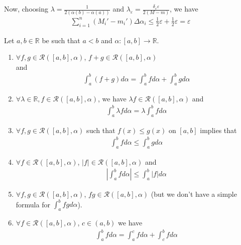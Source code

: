 \documentclass{tufte-handout}
\begin{document}
Now, choosing \( \lambda = \frac{1}{2(\alpha(b) - \alpha(a))} \) and \( \lambda_\varepsilon = \frac{\delta_\varepsilon\varepsilon}{2(M-m)} \), we have
\begin{align}
    \sum_{i=1}^{n}(M_i' - m_i')\Delta \alpha_i \leq \frac{1}{2}\varepsilon + \frac{1}{2}\varepsilon = \varepsilon
\end{align}
\hfill \qedsymbol

\begin{Proposition}
    Let \( a, b \in \mathbb{R} \) be such that \( a<b \)
    and \( \alpha: [a,b]\to \mathbb{R} \).
    \begin{enumerate}
        \item \(\forall f,g \in \mathcal{R}([a,b], \alpha)\), \( f+g \in \mathcal{R}([a,b], \alpha) \)\\
        and 
        \begin{align}
            \int_{a}^b (f+g)d\alpha = \int_{a}^b fd\alpha + \int_{a}^b gd\alpha
        \end{align}
        \item \(\forall \lambda \in \mathbb{R}, f \in \mathcal{R}([a,b], \alpha)\),
        we have \( \lambda f \in \mathcal{R}([a,b], \alpha) \) and\\
        \begin{align}
            \int_{a}^b \lambda f d\alpha = \lambda \int_{a}^b fd\alpha
        \end{align}
        \item \(\forall f,g \in \mathcal{R}([a,b], \alpha)\) such that \( f(x) \leq g(x) \) on \( [a,b] \)
        implies that 
        \begin{align}
            \int_{a}^b fd\alpha \leq \int_{a}^b gd\alpha
        \end{align}
        \item \(\forall f \in \mathcal{R}([a,b], \alpha)\), \( |f| \in \mathcal{R}([a,b], \alpha) \) and
        \begin{align}
            \left|\int_{a}^b fd\alpha\right| \leq \int_{a}^b |f|d\alpha
        \end{align}
        \item \(\forall f,g \in \mathcal{R}([a,b], \alpha)\),
        \( fg \in \mathcal{R}([a,b], \alpha) \) (but we don't have a simple formula for \( \int_{a}^b fg d\alpha \)).
        \item \(\forall f \in \mathcal{R}([a,b], \alpha)\), \( c \in (a,b) \) 
        we have 
        \begin{align}
            \int_{a}^b fd\alpha = \int_{a}^c fd\alpha + \int_{c}^b fd\alpha
        \end{align}
    \end{enumerate}
\end{Proposition}
\end{document}
